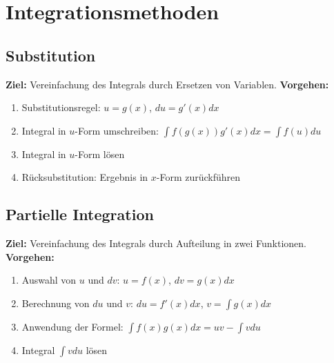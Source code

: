 \section{Integrationsmethoden}
\subsection{Substitution}
\textbf{Ziel:} Vereinfachung des Integrals durch Ersetzen von Variablen.
\textbf{Vorgehen:}
\begin{enumerate}
    \item Substitutionsregel: $u = g(x)$, $du = g'(x) dx$
    \item Integral in $u$-Form umschreiben: $\int f(g(x)) g'(x) dx = \int f(u) du$
    \item Integral in $u$-Form lösen
    \item Rücksubstitution: Ergebnis in $x$-Form zurückführen
\end{enumerate}

\subsection{Partielle Integration}
\textbf{Ziel:} Vereinfachung des Integrals durch Aufteilung in zwei Funktionen.
\textbf{Vorgehen:}
\begin{enumerate}
    \item Auswahl von $u$ und $dv$: $u = f(x)$, $dv = g(x) dx$
    \item Berechnung von $du$ und $v$: $du = f'(x) dx$, $v = \int g(x) dx$
    \item Anwendung der Formel: $\int f(x) g(x) dx = u v - \int v du$
    \item Integral $\int v du$ lösen
\end{enumerate}